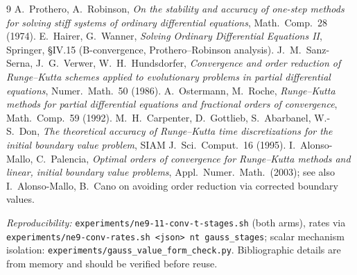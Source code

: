 \documentclass[11pt,a4paper]{article}
\begin{document}
\begin{thebibliography}{9}\small
{} A.~Prothero, A.~Robinson,
  \emph{On the stability and accuracy of one-step methods for solving stiff
  systems of ordinary differential equations}, Math.\ Comp.\ 28 (1974).
 E.~Hairer, G.~Wanner,
  \emph{Solving Ordinary Differential Equations II}, Springer,
  \S IV.15 (B-convergence, Prothero--Robinson analysis).
 J.~M.~Sanz-Serna, J.~G.~Verwer, W.~H.~Hundsdorfer,
  \emph{Convergence and order reduction of Runge--Kutta schemes applied to
  evolutionary problems in partial differential equations},
  Numer.\ Math.\ 50 (1986).
 A.~Ostermann, M.~Roche,
  \emph{Runge--Kutta methods for partial differential equations and fractional
  orders of convergence}, Math.\ Comp.\ 59 (1992).
 M.~H.~Carpenter, D.~Gottlieb, S.~Abarbanel, W.-S.~Don,
  \emph{The theoretical accuracy of Runge--Kutta time discretizations for the
  initial boundary value problem}, SIAM J.\ Sci.\ Comput.\ 16 (1995).
 I.~Alonso-Mallo, C.~Palencia,
  \emph{Optimal orders of convergence for Runge--Kutta methods and linear,
  initial boundary value problems}, Appl.\ Numer.\ Math.\ (2003); see also
  I.~Alonso-Mallo, B.~Cano on avoiding order reduction via corrected boundary
  values.
\end{thebibliography}

\emph{Reproducibility:} \texttt{experiments/ne9-11-conv-t-stages.sh} (both arms),
rates via \texttt{experiments/ne9-conv-rates.sh <json> nt gauss\_stages};
scalar mechanism isolation: \texttt{experiments/gauss\_value\_form\_check.py}.
Bibliographic details are from memory and should be verified before reuse.
\end{document}
